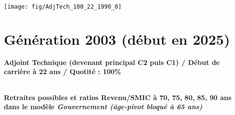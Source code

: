  \vspace{0.1cm} 

 {\hspace{-2.2cm}\texttt{[image: fig/AdjTech\_100\_22\_1990\_0]}} 

\newpage 
 
\section{Génération 2003 (début en 2025)\label{AdjTech_100_22_2003_0}} 
 
{\bf \noindent Adjoint Technique (devenant principal C2 puis C1) / Début de carrière à 22 ans / Quotité : 100\%}  ~ 

 ~\\{\bf \noindent Retraites possibles et ratios Revenu/SMIC à 70, 75, 80, 85, 90 ans dans le modèle \emph{Gouvernement (âge-pivot bloqué à 65 ans)}}  
 
